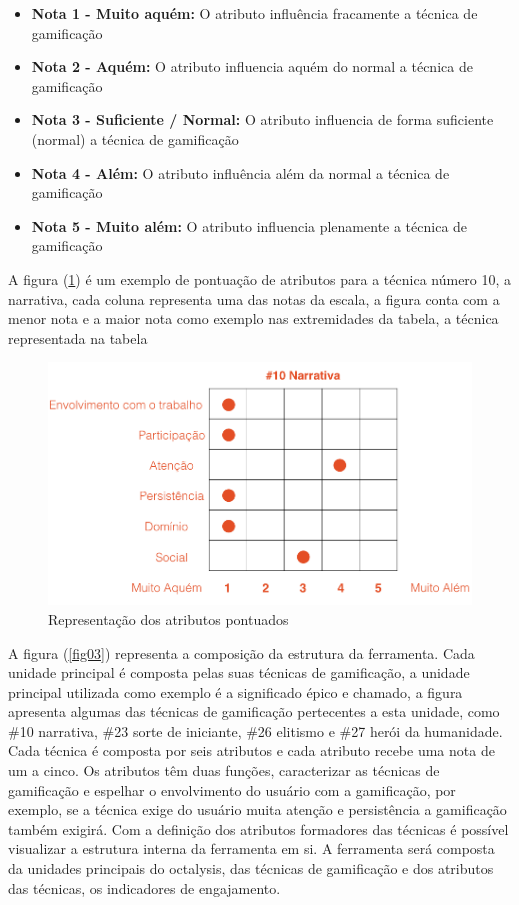 \begin{itemize}
\item  \textbf {Nota 1 - Muito aquém:} O atributo influência fracamente a técnica de gamificação
\item  \textbf {Nota 2 - Aquém:} O atributo influencia aquém do normal a técnica de gamificação
\item  \textbf {Nota 3 - Suficiente / Normal:} O atributo influencia de forma suficiente (normal) a técnica de gamificação
\item  \textbf {Nota 4 - Além:} O atributo influência além da normal a técnica de gamificação
\item  \textbf {Nota 5 - Muito além:} O atributo influencia plenamente a técnica de gamificação
\end{itemize}

\newpage


A figura (\ref{fig02}) é um exemplo de pontuação de atributos para a técnica número 10, a narrativa, cada coluna representa uma das notas da escala, a figura conta com a menor nota e a maior nota como exemplo nas extremidades da tabela, a técnica representada na tabela 

\begin{figure}[h]
	\centering
		\includegraphics[keepaspectratio=true,scale=0.5]{figuras/notas.png}
	\caption{Representação dos atributos pontuados\label{fig02}}
\end{figure}




A figura (\ref{fig03}) representa a composição da estrutura da ferramenta. Cada unidade principal é composta pelas suas técnicas de gamificação, a unidade principal utilizada como exemplo é a significado épico e chamado, a figura apresenta algumas das técnicas de gamificação pertecentes a esta unidade, como \#10 narrativa, \#23 sorte de iniciante, \#26 elitismo e \#27 herói da humanidade. Cada técnica é composta por seis atributos e cada atributo recebe uma nota de um a cinco. Os atributos têm duas funções, caracterizar as técnicas de gamificação e espelhar o envolvimento do usuário com a gamificação, por exemplo, se a técnica exige do usuário muita atenção e persistência a gamificação também exigirá. Com a definição dos atributos formadores das técnicas é possível visualizar a estrutura interna da ferramenta em si. A ferramenta será composta da unidades principais do octalysis, das técnicas de gamificação e dos atributos das técnicas, os indicadores de engajamento. 


